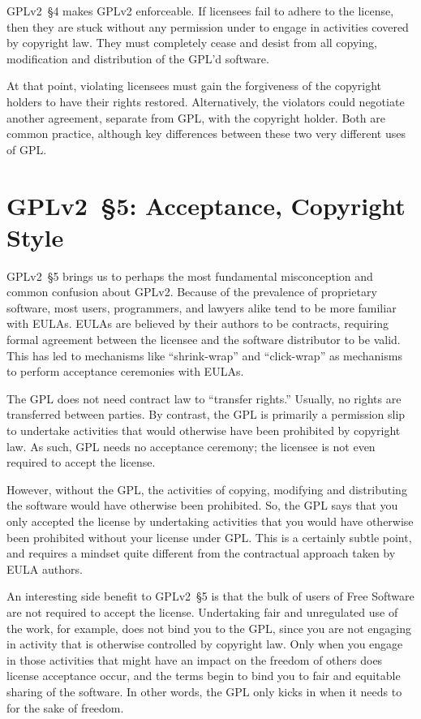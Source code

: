 GPLv2~\S4 makes GPLv2 enforceable.  If licensees fail to adhere to the
license, then they are stuck without any permission under to engage in
activities covered by copyright law.  They must completely cease and desist
from all copying, modification and distribution of the GPL'd software.

At that point, violating licensees must gain the forgiveness of the copyright
holders to have their rights restored.  Alternatively, the violators could
negotiate another agreement, separate from GPL, with the copyright
holder.  Both are common practice, although
 key differences between these two very different uses of GPL.

\section{GPLv2~\S5: Acceptance, Copyright Style}
\label{GPLv2s5}

GPLv2~\S5 brings us to perhaps the most fundamental misconception and common
confusion about GPLv2\@. Because of the prevalence of proprietary software,
most users, programmers, and lawyers alike tend to be more familiar with
EULAs. EULAs are believed by their authors to be contracts, requiring
formal agreement between the licensee and the software distributor to be
valid. This has led to mechanisms like ``shrink-wrap'' and ``click-wrap''
as mechanisms to perform acceptance ceremonies with EULAs.

The GPL does not need contract law to ``transfer rights.''  Usually, no rights
are transferred between parties.  By contrast, the GPL is primarily a permission
slip to undertake activities that would otherwise have been prohibited
by copyright law.  As such, GPL needs no acceptance ceremony; the
licensee is not even required to accept the license.

However, without the GPL, the activities of copying, modifying and
distributing the software would have otherwise been prohibited.  So, the
GPL says that you only accepted the license by undertaking activities that
you would have otherwise been prohibited without your license under GPL\@.
This is a certainly subtle point, and requires a mindset quite different
from the contractual approach taken by EULA authors.

An interesting side benefit to GPLv2~\S5 is that the bulk of users of Free
Software are not required to accept the license.  Undertaking fair and
unregulated use of the work, for example, does not bind you to the GPL,
since you are not engaging in activity that is otherwise controlled by
copyright law.  Only when you engage in those activities that might have an
impact on the freedom of others does license acceptance occur, and the
terms begin to bind you to fair and equitable sharing of the software.  In
other words, the GPL only kicks in when it needs to for the sake of
freedom.

